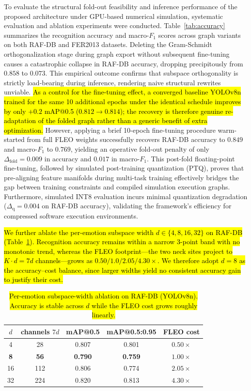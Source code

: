 \documentclass[algorithms,article,submit,moreauthors]{Definitions/mdpi}
\newcommand{\rev}[1]{\hl{#1}}
\begin{document}
To evaluate the structural fold-out feasibility and inference performance of the proposed architecture under GPU-based numerical simulation, systematic evaluation and ablation experiments were conducted. Table~\ref{tab:accuracy} summarizes the recognition accuracy and macro-$F_1$ scores across graph variants on both RAF-DB and FER2013 datasets. Deleting the Gram-Schmidt orthogonalization stage during graph export without subsequent fine-tuning causes a catastrophic collapse in RAF-DB accuracy, dropping precipitously from $0.858$ to $0.073$. This empirical outcome confirms that subspace orthogonality is strictly load-bearing during inference, rendering naive structural rewrites unviable. \rev{As a control for the fine-tuning effect, a converged baseline YOLOv8n trained for the same 10 additional epochs under the identical schedule improves by only \mbox{$+0.2$} mAP@0.5 (\mbox{$0.812 \rightarrow 0.814$}); the recovery is therefore genuine re-adaptation of the folded graph rather than a generic benefit of extra optimization.} However, applying a brief 10-epoch fine-tuning procedure warm-started from full FLEO weights successfully recovers RAF-DB accuracy to $0.849$ and macro-$F_1$ to $0.769$, yielding an operative fold-out penalty of only $\Delta_{\mathrm{fold}} = 0.009$ in accuracy and $0.017$ in macro-$F_1$. This post-fold floating-point fine-tuning, followed by simulated post-training quantization (PTQ), proves that pre-aligning feature manifolds during multi-task training effectively bridges the gap between training constraints and compiled simulation execution graphs. Furthermore, simulated INT8 evaluation incurs minimal quantization degradation ($\Delta_{\mathrm{q}} = 0.004$ on RAF-DB accuracy), validating the framework's efficiency for compressed software execution environments.

\rev{We further ablate the per-emotion subspace width \mbox{$d\in\{4,8,16,32\}$} on RAF-DB (Table~\ref{tab:dablation}). Recognition accuracy remains within a narrow 3-point band with no monotonic trend, whereas the FLEO footprint---the two neck sites project to \mbox{$K\!\cdot\!d=7d$} channels---grows as \mbox{$0.50/1.0/2.05/4.30\times$}. We therefore adopt \mbox{$d=8$} as the accuracy--cost balance, since larger widths yield no consistent accuracy gain to justify their cost.}

\begin{table}[h]
\centering
\caption{\rev{Per-emotion subspace-width ablation on RAF-DB (YOLOv8n). Accuracy is stable across $d$ while the FLEO cost grows roughly linearly.}}
\label{tab:dablation}
\begin{tabular}{ccccc}
\toprule
$d$ & channels $7d$ & mAP@0.5 & mAP@0.5:0.95 & FLEO cost \\
\midrule
4  & 28  & 0.807 & 0.801 & $0.50\times$ \\
\textbf{8}  & \textbf{56}  & \textbf{0.790} & \textbf{0.759} & $\mathbf{1.00\times}$ \\
16 & 112 & 0.806 & 0.774 & $2.05\times$ \\
32 & 224 & 0.820 & 0.813 & $4.30\times$ \\
\bottomrule
\end{tabular}
\end{table}
\end{document}
